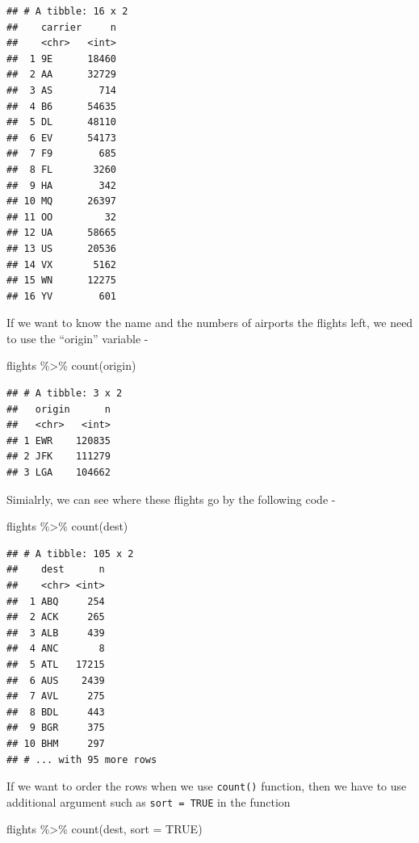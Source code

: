 \documentclass[
]{book}
\newenvironment{Shaded}{\begin{snugshade}}{\end{snugshade}}
\newcommand{\AttributeTok}[1]{\textcolor[rgb]{0.77,0.63,0.00}{#1}}
\newcommand{\ConstantTok}[1]{\textcolor[rgb]{0.00,0.00,0.00}{#1}}
\newcommand{\FunctionTok}[1]{\textcolor[rgb]{0.00,0.00,0.00}{#1}}
\newcommand{\NormalTok}[1]{#1}
\newcommand{\SpecialCharTok}[1]{\textcolor[rgb]{0.00,0.00,0.00}{#1}}
\begin{document}
\begin{verbatim}
## # A tibble: 16 x 2
##    carrier     n
##    <chr>   <int>
##  1 9E      18460
##  2 AA      32729
##  3 AS        714
##  4 B6      54635
##  5 DL      48110
##  6 EV      54173
##  7 F9        685
##  8 FL       3260
##  9 HA        342
## 10 MQ      26397
## 11 OO         32
## 12 UA      58665
## 13 US      20536
## 14 VX       5162
## 15 WN      12275
## 16 YV        601
\end{verbatim}

If we want to know the name and the numbers of airports the flights left, we need to use the ``origin'' variable -

\begin{Shaded}
\begin{Highlighting}[]
\NormalTok{flights }\SpecialCharTok{\%\textgreater{}\%} 
  \FunctionTok{count}\NormalTok{(origin)}
\end{Highlighting}
\end{Shaded}

\begin{verbatim}
## # A tibble: 3 x 2
##   origin      n
##   <chr>   <int>
## 1 EWR    120835
## 2 JFK    111279
## 3 LGA    104662
\end{verbatim}

Simialrly, we can see where these flights go by the following code -

\begin{Shaded}
\begin{Highlighting}[]
\NormalTok{flights }\SpecialCharTok{\%\textgreater{}\%} 
  \FunctionTok{count}\NormalTok{(dest)}
\end{Highlighting}
\end{Shaded}

\begin{verbatim}
## # A tibble: 105 x 2
##    dest      n
##    <chr> <int>
##  1 ABQ     254
##  2 ACK     265
##  3 ALB     439
##  4 ANC       8
##  5 ATL   17215
##  6 AUS    2439
##  7 AVL     275
##  8 BDL     443
##  9 BGR     375
## 10 BHM     297
## # ... with 95 more rows
\end{verbatim}

If we want to order the rows when we use \texttt{count()} function, then we have to use additional argument such as \texttt{sort\ =\ TRUE} in the function

\begin{Shaded}
\begin{Highlighting}[]
\NormalTok{flights }\SpecialCharTok{\%\textgreater{}\%} 
  \FunctionTok{count}\NormalTok{(dest, }\AttributeTok{sort =} \ConstantTok{TRUE}\NormalTok{)}
\end{Highlighting}
\end{Shaded}
\end{document}
